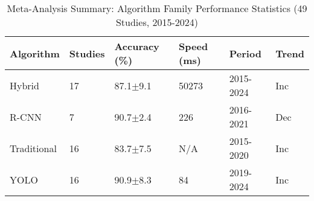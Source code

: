 
\begin{table}[htbp]
\centering
\small
\caption{Meta-Analysis Summary: Algorithm Family Performance Statistics (49 Studies, 2015-2024)}
\label{tab:meta_analysis_summary}
\renewcommand{\arraystretch}{1.3}
\begin{tabular}{p{2cm}p{1.5cm}p{2cm}p{2cm}p{1.5cm}p{2cm}}
\toprule
\textbf{Algorithm} & \textbf{Studies} & \textbf{Accuracy (\%)} & \textbf{Speed (ms)} & \textbf{Period} & \textbf{Trend} \\
\midrule
Hybrid & 17 & 87.1$\pm$9.1 & 50273 & 2015-2024 & Inc \\
R-CNN & 7 & 90.7$\pm$2.4 & 226 & 2016-2021 & Dec \\
Traditional & 16 & 83.7$\pm$7.5 & N/A & 2015-2020 & Inc \\
YOLO & 16 & 90.9$\pm$8.3 & 84 & 2019-2024 & Inc \\
\bottomrule
\end{tabular}
\end{table}
